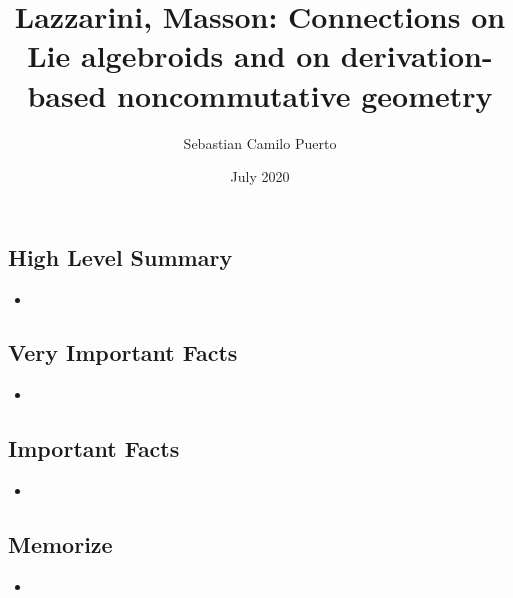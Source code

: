 \documentclass{article}
\title{Lazzarini, Masson: Connections on Lie algebroids and on derivation-based noncommutative geometry}
\author{Sebastian Camilo Puerto}
\date{July 2020}
\begin{document}
\maketitle

\tableofcontents

\subsection{High Level Summary}

    \begin{itemize}

    \item 
    
    \end{itemize}

\subsection{Very Important Facts}

    \begin{itemize}

    \item 
    
    \end{itemize}

\subsection{Important Facts}

    \begin{itemize}

    \item 
    
    \end{itemize}

\subsection{Memorize}

    \begin{itemize}

    \item 
    
    \end{itemize}
\end{document}
